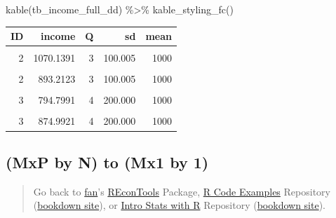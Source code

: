 \documentclass[
]{book}
\newenvironment{Shaded}{\begin{snugshade}}{\end{snugshade}}
\newcommand{\FunctionTok}[1]{\textcolor[rgb]{0.00,0.00,0.00}{#1}}
\newcommand{\NormalTok}[1]{#1}
\newcommand{\SpecialCharTok}[1]{\textcolor[rgb]{0.00,0.00,0.00}{#1}}
\begin{document}
\begin{Shaded}
\begin{Highlighting}[]
\FunctionTok{kable}\NormalTok{(tb\_income\_full\_dd) }\SpecialCharTok{\%\textgreater{}\%}
  \FunctionTok{kable\_styling\_fc}\NormalTok{()}
\end{Highlighting}
\end{Shaded}

\begin{table}[!h]
\centering
\begin{tabular}{r|r|r|r|r}
\hline
ID & income & Q & sd & mean\\
\hline
\cellcolor{gray!6}{1} & \cellcolor{gray!6}{999.9803} & \cellcolor{gray!6}{1} & \cellcolor{gray!6}{0.010} & \cellcolor{gray!6}{1000}\\
\hline
2 & 1070.1391 & 3 & 100.005 & 1000\\
\hline
\cellcolor{gray!6}{2} & \cellcolor{gray!6}{952.7185} & \cellcolor{gray!6}{3} & \cellcolor{gray!6}{100.005} & \cellcolor{gray!6}{1000}\\
\hline
2 & 893.2123 & 3 & 100.005 & 1000\\
\hline
\cellcolor{gray!6}{3} & \cellcolor{gray!6}{956.4050} & \cellcolor{gray!6}{4} & \cellcolor{gray!6}{200.000} & \cellcolor{gray!6}{1000}\\
\hline
3 & 794.7991 & 4 & 200.000 & 1000\\
\hline
\cellcolor{gray!6}{3} & \cellcolor{gray!6}{854.2218} & \cellcolor{gray!6}{4} & \cellcolor{gray!6}{200.000} & \cellcolor{gray!6}{1000}\\
\hline
3 & 874.9921 & 4 & 200.000 & 1000\\
\hline
\end{tabular}
\end{table}

\hypertarget{mxp-by-n-to-mx1-by-1}{%
\subsection{(MxP by N) to (Mx1 by 1)}\label{mxp-by-n-to-mx1-by-1}}

\begin{quote}
Go back to \href{http://fanwangecon.github.io/}{fan}'s \href{https://fanwangecon.github.io/REconTools/}{REconTools} Package, \href{https://fanwangecon.github.io/R4Econ/}{R Code Examples} Repository (\href{https://fanwangecon.github.io/R4Econ/bookdown}{bookdown site}), or \href{https://fanwangecon.github.io/Stat4Econ/}{Intro Stats with R} Repository (\href{https://fanwangecon.github.io/Stat4Econ/bookdown}{bookdown site}).
\end{quote}
\end{document}
